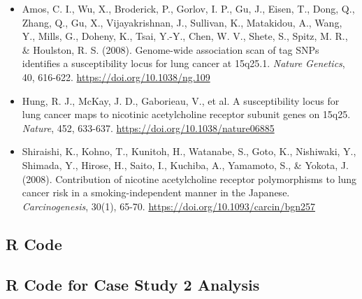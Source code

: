 \documentclass{article}
\begin{document}
	\begin{itemize}
		\item Amos, C. I., Wu, X., Broderick, P., Gorlov, I. P., Gu, J., Eisen, T., Dong, Q., Zhang, Q., Gu, X., Vijayakrishnan, J., Sullivan, K., Matakidou, A., Wang, Y., Mills, G., Doheny, K., Tsai, Y.-Y., Chen, W. V., Shete, S., Spitz, M. R., \& Houlston, R. S. (2008). Genome-wide association scan of tag SNPs identifies a susceptibility locus for lung cancer at 15q25.1. \textit{Nature Genetics}, 40, 616-622. \url{https://doi.org/10.1038/ng.109}
		\item Hung, R. J., McKay, J. D., Gaborieau, V., et al. A susceptibility locus for lung cancer maps to nicotinic acetylcholine receptor subunit genes on 15q25. \textit{Nature}, 452, 633-637. \url{https://doi.org/10.1038/nature06885}
		\item Shiraishi, K., Kohno, T., Kunitoh, H., Watanabe, S., Goto, K., Nishiwaki, Y., Shimada, Y., Hirose, H., Saito, I., Kuchiba, A., Yamamoto, S., \& Yokota, J. (2008). Contribution of nicotine acetylcholine receptor polymorphisms to lung cancer risk in a smoking-independent manner in the Japanese. \textit{Carcinogenesis}, 30(1), 65-70. \url{https://doi.org/10.1093/carcin/bgn257}
	\end{itemize}


	\subsection*{R Code}

	\subsection*{R Code for Case Study 2 Analysis}
\end{document}
